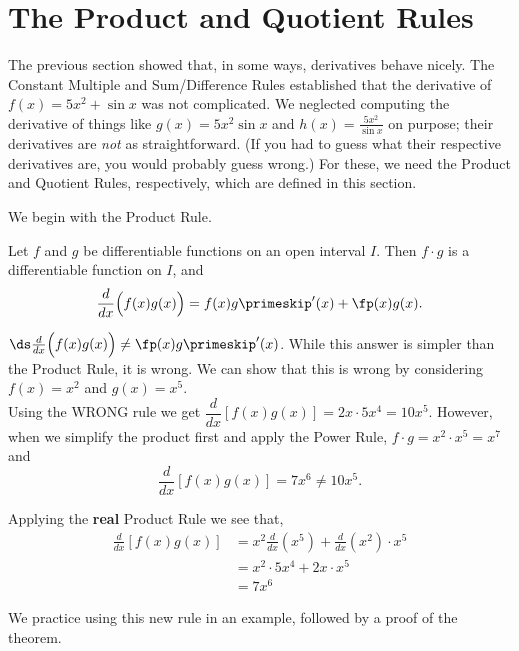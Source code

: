 \section{The Product and Quotient Rules}\label{sec:prod_quot_rules}

The previous section showed that, in some ways, derivatives behave nicely. The Constant Multiple and Sum/Difference Rules established that the derivative of $f(x) = 5x^2+\sin x $ was not complicated. We neglected computing the derivative of things like $g(x) = 5x^2\sin x$ and $h(x) = \frac{5x^2}{\sin x}$ on purpose; their derivatives are \textit{not} as straightforward. (If you had to guess what their respective derivatives are, you would probably guess wrong.) For these, we need the Product and Quotient Rules, respectively, which are defined in this section. 

We begin with the Product Rule.

\begin{theorem}\label{thm:ProductRule}
Let $f$ and $g$ be differentiable functions on an open interval $I$. Then $f\cdot g$ is a differentiable function on $I$, and \[\frac{d}{dx}\Big(f(x)g(x)\Big) = f(x)g\primeskip'(x) + \fp(x)g(x).\]
\end{theorem}

 $\ds\frac{d}{dx}\Big(f(x)g(x)\Big) \neq \fp(x)g\primeskip'(x)$. While this answer is simpler than the Product Rule, it is wrong.  We can show that this is wrong by considering \\
$f(x)=x^2$ and $g(x)=x^5$. \\
Using the WRONG rule we get $\dfrac{d}{dx}[f(x)g(x)] =2x \cdot 5x^4 = 10x^5$. However, when we simplify the product first and apply the Power Rule, $f \cdot g = x^2 \cdot x^5 = x^7$ and 
\[\frac{d}{dx}[f(x)g(x)] = 7x^6 \neq 10x^5.\]

Applying the \textbf{real} Product Rule we see that,
\begin{align*}
\frac{d}{dx}[f(x)g(x)]
& = x^2 \frac{d}{dx} (x^5) + \frac{d}{dx} (x^2) \cdot x^5 \\ 
& = x^2 \cdot 5x^4+2x \cdot x^5 \\ 
&= 7x^6
\end{align*}


We practice using this new rule in an example, followed by a proof of the theorem.

